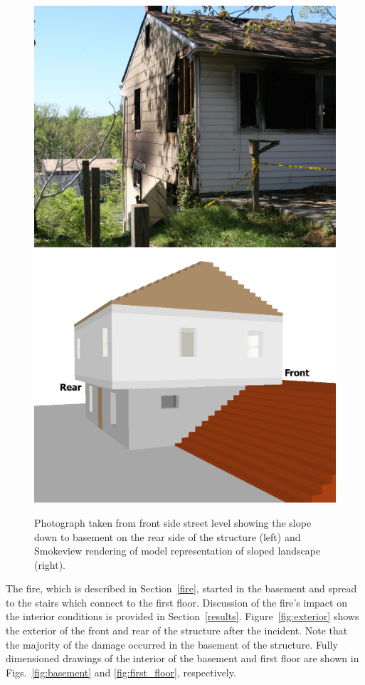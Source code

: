 \documentclass[12pt,oneside]{book}
\begin{document}
\begin{figure}[!ht]
\includegraphics[width=.5\textwidth]{../Figures/PGCo_Slope}
\includegraphics[width=.5\textwidth]{../Figures/pg_county_slope} \\
\caption[Photograph and computer model rendering of terrain.]{Photograph taken from front side street level showing the slope down to basement on the rear side of the structure (left) and Smokeview rendering of model representation of sloped landscape (right).}
\label{fig:slope}
\end{figure}

The fire, which is described in Section~\ref{fire}, started in the basement and spread to the stairs which connect to the first floor. Discussion of the fire's impact on the interior conditions is provided in Section~\ref{results}. Figure~\ref{fig:exterior} shows the exterior of the front and rear of the structure after the incident. Note that the majority of the damage occurred in the basement of the structure. Fully dimensioned drawings of the interior of the basement and first floor are shown in Figs.~\ref{fig:basement} and \ref{fig:first_floor}, respectively.
\end{document}
